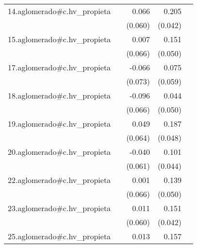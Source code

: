 {\begin{longtable}{l*{4}{D{.}{.}{-1}}}
\addlinespace
14.aglomerado#c.hv\_propieta&                     &       0.066         &       0.205\sym{***}&                     \\
            &                     &     (0.060)         &     (0.042)         &                     \\
\addlinespace
15.aglomerado#c.hv\_propieta&                     &       0.007         &       0.151\sym{**} &                     \\
            &                     &     (0.066)         &     (0.050)         &                     \\
\addlinespace
17.aglomerado#c.hv\_propieta&                     &      -0.066         &       0.075         &                     \\
            &                     &     (0.073)         &     (0.059)         &                     \\
\addlinespace
18.aglomerado#c.hv\_propieta&                     &      -0.096         &       0.044         &                     \\
            &                     &     (0.066)         &     (0.050)         &                     \\
\addlinespace
19.aglomerado#c.hv\_propieta&                     &       0.049         &       0.187\sym{***}&                     \\
            &                     &     (0.064)         &     (0.048)         &                     \\
\addlinespace
20.aglomerado#c.hv\_propieta&                     &      -0.040         &       0.101\sym{*}  &                     \\
            &                     &     (0.061)         &     (0.044)         &                     \\
\addlinespace
22.aglomerado#c.hv\_propieta&                     &       0.001         &       0.139\sym{**} &                     \\
            &                     &     (0.066)         &     (0.050)         &                     \\
\addlinespace
23.aglomerado#c.hv\_propieta&                     &       0.011         &       0.151\sym{***}&                     \\
            &                     &     (0.060)         &     (0.042)         &                     \\
\addlinespace
25.aglomerado#c.hv\_propieta&                     &       0.013         &       0.157\sym{***}&                     \\

\end{longtable}}
